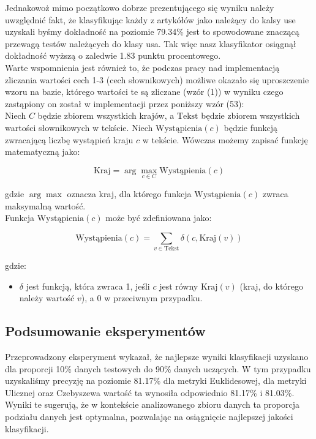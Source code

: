 \documentclass{article}
\begin{document}
\noindent Jednakowoż mimo początkowo dobrze prezentującego się wyniku należy uwzględnić fakt, że klasyfikując każdy z artykółów jako należący do kalsy use uzyskali byśmy dokładność na poziomie 79.34\% jest to spowodowane znaczącą przewagą testów należących do klasy usa. Tak więc nasz klasyfikator osiągnął dokładność wyższą o zaledwie 1.83 punktu procentowego. \\

\noindent Warte wspomnienia jest również to, że podczas pracy nad implementacją zliczania wartości cech 1-3 (cech słownikowych) możliwe okazało się uproszczenie wzoru na bazie, którego wartości te są zliczane (wzór (1)) w wyniku czego zastąpiony on został w implementacji przez poniższy wzór (53): \\

Niech $C$ będzie zbiorem wszystkich krajów, a $\text{Tekst}$ będzie zbiorem wszystkich wartości słownikowych w tekście. Niech $\text{Wystąpienia}(c)$ będzie funkcją zwracającą liczbę wystąpień kraju $c$ w tekście. Wówczas możemy zapisać funkcję matematyczną jako:

\begin{equation}
\text{Kraj} = \arg\max_{c \in C} \text{Wystąpienia}(c)
\end{equation}

\noindent gdzie $\arg\max$ oznacza kraj, dla którego funkcja $\text{Wystąpienia}(c)$ zwraca maksymalną wartość. \\

Funkcja $\text{Wystąpienia}(c)$ może być zdefiniowana jako:

\begin{equation}
\text{Wystąpienia}(c) = \sum_{v \in \text{Tekst}} \delta(c, \text{Kraj}(v))
\end{equation}

gdzie:
\begin{itemize}
    \item $\delta$ jest funkcją, która zwraca 1, jeśli $c$ jest równy $\text{Kraj}(v)$ (kraj, do którego należy wartość $v$), a 0 w przeciwnym przypadku.
\end{itemize}

\subsection*{Podsumowanie eksperymentów}

\noindent Przeprowadzony eksperyment wykazał, że najlepsze wyniki klasyfikacji uzyskano dla proporcji 10\% danych testowych do 90\% danych uczących. W tym przypadku uzyskaliśmy precyzję na poziomie 81.17\% dla metryki Euklidesowej, dla metryki Ulicznej oraz Czebyszewa wartość ta wynosiła odpowiednio 81.17\% i 81.03\%. Wyniki te sugerują, że w kontekście analizowanego zbioru danych ta proporcja podziału danych jest optymalna, pozwalając na osiągnięcie najlepszej jakości klasyfikacji. \\
\end{document}
